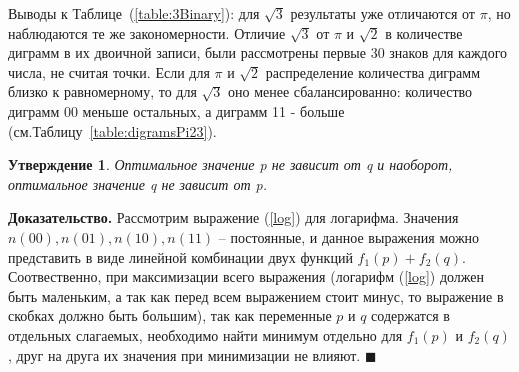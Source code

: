 \documentclass[12pt]{article}
\newtheorem{sttm}{Утверждение}
\newcommand{\qed}{\hfill $\blacksquare$}
\begin{document}
	Выводы к Таблице~(\ref{table:3Binary}): для $\sqrt{3}$ результаты уже отличаются от $\pi$, но наблюдаются те же закономерности. Отличие $\sqrt{3}$ от $\pi$ и $\sqrt{2}$ в количестве диграмм в их двоичной записи, были рассмотрены первые 30 знаков для каждого числа, не считая точки. Если для $\pi$ и $\sqrt{2}$ распределение количества диграмм близко к равномерному, то для $\sqrt{3}$ оно менее сбалансированно: количество диграмм 00 меньше остальных, а диграмм 11 - больше (см.Таблицу~\ref{table:digramsPi23}).
	
	\begin{sttm}\label{sttm:independence} Оптимальное значение p не зависит от q и наоборот, оптимальное значение q не зависит от p.
	\end{sttm}
	{\bf Доказательство.} Рассмотрим выражение (\ref{log}) для логарифма. Значения $n(00), n(01), n(10), n(11)$ -- постоянные, и данное выражения можно представить в виде линейной комбинации двух функций $f_1(p)+f_2(q)$. Соотвественно, при максимизации всего выражения (логарифм (\ref{log}) должен быть маленьким, а так как перед всем выражением стоит минус, то выражение в скобках должно быть большим), так как переменные $p$ и $q$ содержатся в отдельных слагаемых, необходимо найти минимум отдельно для $f_1(p)$ и $f_2(q)$, друг на друга их значения при минимизации не влияют. \qed
	
\end{document}
